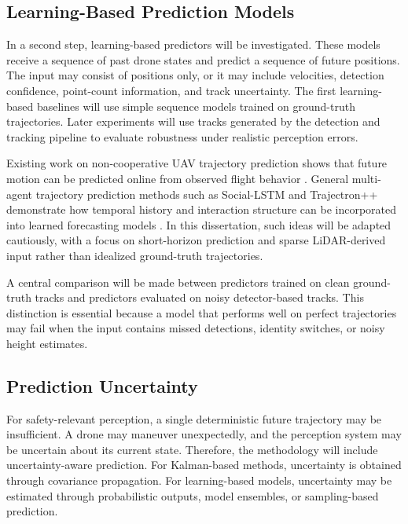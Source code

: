\subsection{Learning-Based Prediction Models}

In a second step, learning-based predictors will be investigated. These models receive a sequence of past drone states and predict a sequence of future positions. The input may consist of positions only, or it may include velocities, detection confidence, point-count information, and track uncertainty. The first learning-based baselines will use simple sequence models trained on ground-truth trajectories. Later experiments will use tracks generated by the detection and tracking pipeline to evaluate robustness under realistic perception errors.

Existing work on non-cooperative UAV trajectory prediction shows that future motion can be predicted online from observed flight behavior \cite{xie2022noncooperativeUAVPrediction}. General multi-agent trajectory prediction methods such as Social-LSTM and Trajectron++ demonstrate how temporal history and interaction structure can be incorporated into learned forecasting models \cite{alahi2016socialLSTM,salzmann2020trajectronpp}. In this dissertation, such ideas will be adapted cautiously, with a focus on short-horizon prediction and sparse LiDAR-derived input rather than idealized ground-truth trajectories.

A central comparison will be made between predictors trained on clean ground-truth tracks and predictors evaluated on noisy detector-based tracks. This distinction is essential because a model that performs well on perfect trajectories may fail when the input contains missed detections, identity switches, or noisy height estimates.

\subsection{Prediction Uncertainty}

For safety-relevant perception, a single deterministic future trajectory may be insufficient. A drone may maneuver unexpectedly, and the perception system may be uncertain about its current state. Therefore, the methodology will include uncertainty-aware prediction. For Kalman-based methods, uncertainty is obtained through covariance propagation. For learning-based models, uncertainty may be estimated through probabilistic outputs, model ensembles, or sampling-based prediction.

